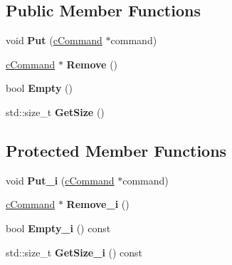 \subsection*{\-Public \-Member \-Functions}
\begin{DoxyCompactItemize}
\item 
\hypertarget{classengine_1_1cCommandQueue_a1d60f01d5e9bd4d17c892257e20b2b89}{
void {\bfseries \-Put} (\hyperlink{classengine_1_1cCommand}{c\-Command} $\ast$command)}
\label{classengine_1_1cCommandQueue_a1d60f01d5e9bd4d17c892257e20b2b89}

\item 
\hypertarget{classengine_1_1cCommandQueue_a7979f6e2a55a331083c879f4265895f5}{
\hyperlink{classengine_1_1cCommand}{c\-Command} $\ast$ {\bfseries \-Remove} ()}
\label{classengine_1_1cCommandQueue_a7979f6e2a55a331083c879f4265895f5}

\item 
\hypertarget{classengine_1_1cCommandQueue_a727d36f68de37caba84869e3f973ccbc}{
bool {\bfseries \-Empty} ()}
\label{classengine_1_1cCommandQueue_a727d36f68de37caba84869e3f973ccbc}

\item 
\hypertarget{classengine_1_1cCommandQueue_af6b95fb876418671d6285ee368abca25}{
std\-::size\-\_\-t {\bfseries \-Get\-Size} ()}
\label{classengine_1_1cCommandQueue_af6b95fb876418671d6285ee368abca25}

\end{DoxyCompactItemize}
\subsection*{\-Protected \-Member \-Functions}
\begin{DoxyCompactItemize}
\item 
\hypertarget{classengine_1_1cCommandQueue_a3e66c5c4390594c00276229ddf2d3e39}{
void {\bfseries \-Put\-\_\-i} (\hyperlink{classengine_1_1cCommand}{c\-Command} $\ast$command)}
\label{classengine_1_1cCommandQueue_a3e66c5c4390594c00276229ddf2d3e39}

\item 
\hypertarget{classengine_1_1cCommandQueue_acaee2664e59c4e91aeeac18066df9716}{
\hyperlink{classengine_1_1cCommand}{c\-Command} $\ast$ {\bfseries \-Remove\-\_\-i} ()}
\label{classengine_1_1cCommandQueue_acaee2664e59c4e91aeeac18066df9716}

\item 
\hypertarget{classengine_1_1cCommandQueue_a7c8a6bd8dae5c050634cededcb77ef4d}{
bool {\bfseries \-Empty\-\_\-i} () const }
\label{classengine_1_1cCommandQueue_a7c8a6bd8dae5c050634cededcb77ef4d}

\item 
\hypertarget{classengine_1_1cCommandQueue_a2b729f6d9866c6e9b50e142f7e475b05}{
std\-::size\-\_\-t {\bfseries \-Get\-Size\-\_\-i} () const }
\label{classengine_1_1cCommandQueue_a2b729f6d9866c6e9b50e142f7e475b05}

\end{DoxyCompactItemize}
